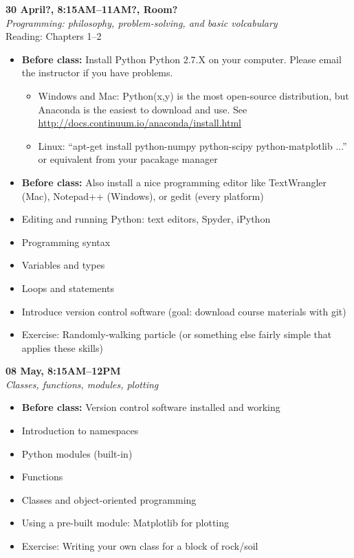 \documentclass[10pt,a4paper]{amsart}
\begin{document}
\begin{minipage}{\linewidth} 
\noindent \textbf{30 April?, 8:15AM--11AM?, Room?}\\
\textit{Programming: philosophy, problem-solving, and basic volcabulary}\\
Reading: Chapters 1--2
\begin{itemize}
 \item \textbf{Before class:} Install Python Python 2.7.X on your computer. Please email the instructor if you have problems.
 \begin{itemize}
  \item Windows and Mac: Python(x,y) is the most open-source distribution, but Anaconda is the easiest to download and use. See \url{http://docs.continuum.io/anaconda/install.html}
  \item Linux: ``apt-get install python-numpy python-scipy python-matplotlib ...'' or equivalent from your pacakage manager
 \end{itemize}
 \item \textbf{Before class:} Also install a nice programming editor like TextWrangler (Mac), Notepad++ (Windows), or gedit (every platform)
 \item Editing and running Python: text editors, Spyder, iPython
 \item Programming syntax
 \item Variables and types
 \item Loops and statements
 \item Introduce version control software (goal: download course materials with git)
 \item Exercise: Randomly-walking particle (or something else fairly simple that applies these skills)
\end{itemize}
\vspace{12pt}
\end{minipage}

\begin{minipage}{\linewidth}
\noindent \textbf{08 May, 8:15AM--12PM}\\
\textit{Classes, functions, modules, plotting}
\begin{itemize}
 \item \textbf{Before class:} Version control software installed and working
 \item Introduction to namespaces
 \item Python modules (built-in)
 \item Functions
 \item Classes and object-oriented programming
 \item Using a pre-built module: Matplotlib for plotting
 \item Exercise: Writing your own class for a block of rock/soil
\end{itemize}
\vspace{12pt}
\end{minipage}
\end{document}
